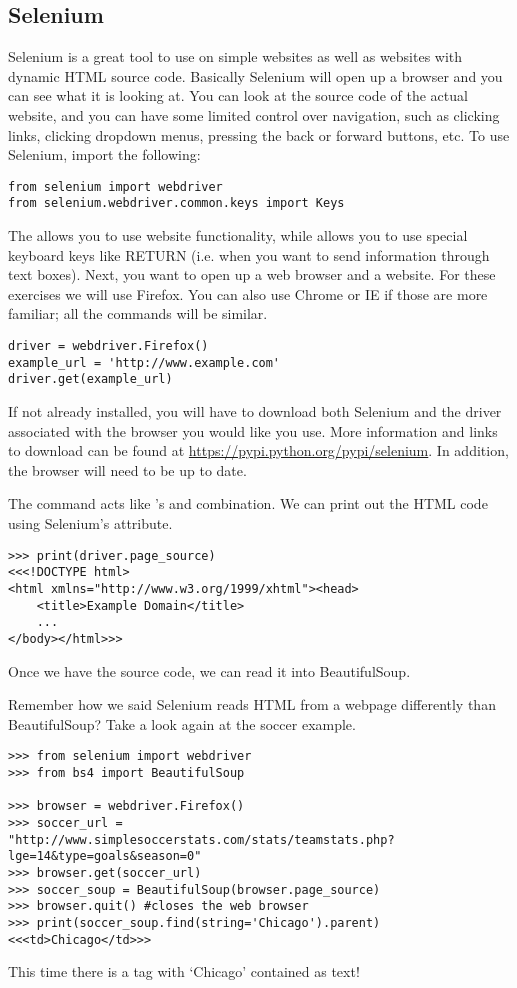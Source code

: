 \subsection*{Selenium}

Selenium is a great tool to use on simple websites as well as websites with dynamic HTML source code.
Basically Selenium will open up a browser and you can see what it is looking at.
You can look at the source code of the actual website, and you can have some limited control over navigation, such as clicking links, clicking dropdown menus, pressing the back or forward buttons, etc.
To use Selenium, import the following:
\begin{lstlisting}
from selenium import webdriver
from selenium.webdriver.common.keys import Keys
\end{lstlisting}
The  allows you to use website functionality, while  allows you to use special keyboard keys like RETURN (i.e. when you want to send information through text boxes).
Next, you want to open up a web browser and a website.
For these exercises we will use Firefox.
You can also use Chrome or IE if those are more familiar; all the commands will be similar.

\begin{lstlisting}
driver = webdriver.Firefox()
example_url = 'http://www.example.com'
driver.get(example_url)
\end{lstlisting}

\begin{info}
If not already installed, you will have to download both Selenium and the driver associated with the browser you would like you use. More information and links to download can be found at \url{https://pypi.python.org/pypi/selenium}. In addition, the browser will need to be up to date.
\end{info}

The  command acts like 's  and  combination.
We can print out the HTML code using Selenium's  attribute.
\begin{lstlisting}
>>> print(driver.page_source)
<<<!DOCTYPE html>
<html xmlns="http://www.w3.org/1999/xhtml"><head>
    <title>Example Domain</title>
    ...
</body></html>>>
\end{lstlisting}
Once we have the source code, we can read it into BeautifulSoup.

Remember how we said Selenium reads HTML from a webpage differently than BeautifulSoup?
Take a look again at the soccer example.
\begin{lstlisting}
>>> from selenium import webdriver
>>> from bs4 import BeautifulSoup

>>> browser = webdriver.Firefox()
>>> soccer_url = "http://www.simplesoccerstats.com/stats/teamstats.php?lge=14&type=goals&season=0"
>>> browser.get(soccer_url)
>>> soccer_soup = BeautifulSoup(browser.page_source)
>>> browser.quit() #closes the web browser
>>> print(soccer_soup.find(string='Chicago').parent)
<<<td>Chicago</td>>>
\end{lstlisting}
This time there is a tag with `Chicago' contained as text!

